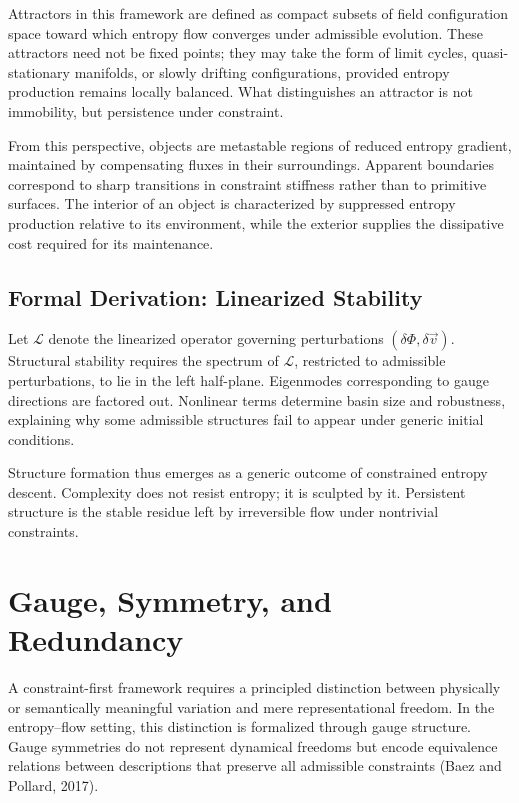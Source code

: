 \documentclass[11pt]{article}
\begin{document}
Attractors in this framework are defined as compact subsets of field configuration space toward which entropy flow converges under admissible evolution. These attractors need not be fixed points; they may take the form of limit cycles, quasi-stationary manifolds, or slowly drifting configurations, provided entropy production remains locally balanced. What distinguishes an attractor is not immobility, but persistence under constraint.

From this perspective, objects are metastable regions of reduced entropy gradient, maintained by compensating fluxes in their surroundings. Apparent boundaries correspond to sharp transitions in constraint stiffness rather than to primitive surfaces. The interior of an object is characterized by suppressed entropy production relative to its environment, while the exterior supplies the dissipative cost required for its maintenance.

\subsection*{Formal Derivation: Linearized Stability}

Let $\mathcal{L}$ denote the linearized operator governing perturbations $(\delta \Phi, \delta \vec{v})$. Structural stability requires the spectrum of $\mathcal{L}$, restricted to admissible perturbations, to lie in the left half-plane. Eigenmodes corresponding to gauge directions are factored out. Nonlinear terms determine basin size and robustness, explaining why some admissible structures fail to appear under generic initial conditions.

Structure formation thus emerges as a generic outcome of constrained entropy descent. Complexity does not resist entropy; it is sculpted by it. Persistent structure is the stable residue left by irreversible flow under nontrivial constraints.

\bigskip

\section{Gauge, Symmetry, and Redundancy}

A constraint-first framework requires a principled distinction between physically or semantically meaningful variation and mere representational freedom. In the entropy–flow setting, this distinction is formalized through gauge structure. Gauge symmetries do not represent dynamical freedoms but encode equivalence relations between descriptions that preserve all admissible constraints (Baez and Pollard, 2017).
\end{document}
